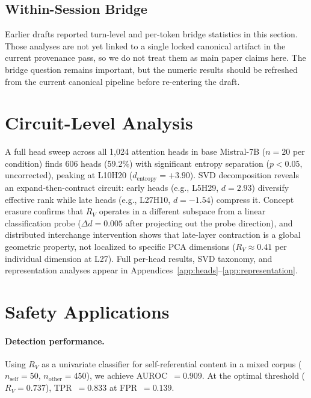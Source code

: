 \documentclass{article}
\newcommand{\RV}{R_V}
\newcommand{\dcohen}{d}
\begin{document}
\subsection{Within-Session Bridge}
\label{sec:bridge}

Earlier drafts reported turn-level and per-token bridge statistics in this section.
Those analyses are not yet linked to a single locked canonical artifact in the current provenance
pass, so we do not treat them as main paper claims here.
The bridge question remains important, but the numeric results should be refreshed from the current
canonical pipeline before re-entering the draft.


\section{Circuit-Level Analysis}
\label{sec:circuits}

A full head sweep across all 1{,}024 attention heads in base Mistral-7B ($n = 20$ per condition)
finds 606 heads (59.2\%) with significant entropy separation ($p < 0.05$, uncorrected),
peaking at L10H20 ($\dcohen_\mathrm{entropy} = +3.90$).
SVD decomposition reveals an expand-then-contract circuit: early heads (e.g., L5H29,
$\dcohen = 2.93$) diversify effective rank while late heads (e.g., L27H10, $\dcohen = -1.54$)
compress it.
Concept erasure confirms that $\RV$ operates in a different subspace from a linear
classification probe ($\Delta d = 0.005$ after projecting out the probe direction), and
distributed interchange intervention shows that late-layer contraction is a global geometric
property, not localized to specific PCA dimensions ($\RV \approx 0.41$ per individual dimension
at L27).
Full per-head results, SVD taxonomy, and representation analyses appear in
Appendices~\ref{app:heads}--\ref{app:representation}.


\section{Safety Applications}
\label{sec:safety}

\paragraph{Detection performance.}
Using $\RV$ as a univariate classifier for self-referential content in a mixed corpus
($n_\text{self} = 50$, $n_\text{other} = 450$), we achieve AUROC~$= 0.909$.
At the optimal threshold ($\RV = 0.737$), TPR~$= 0.833$ at FPR~$= 0.139$.
\end{document}
